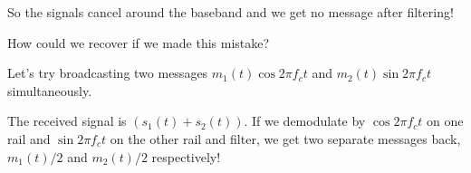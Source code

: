 \documentclass[12pt]{report}
\begin{document}
\begin{center}
    \end{center}

    So the signals cancel around the baseband and we get no message after filtering!

    How could we recover if we made this mistake? 

    Let's try broadcasting two messages $m_1(t) \cos 2\pi f_c t$ and $m_2(t) \sin 2\pi f_c t$ simultaneously.

    The received signal is $(s_1(t) + s_2(t))$. If we demodulate by $\cos 2\pi f_c t$ on one rail and $\sin 2\pi f_c t$ on the other rail and filter, we get two separate messages back, $m_1(t)/2$ and $m_2(t)/2$ respectively! 
\end{document}
